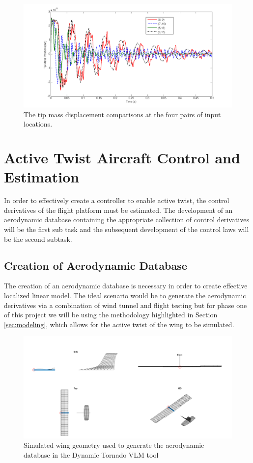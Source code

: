 \documentclass[11pt]{ucthesis}
\begin{document}
\begin{figure}[thpb]
\centering
\includegraphics[width=1\linewidth]{Figures/twoinput_tip.png}
\caption{The tip mass displacement comparisons at the four pairs of input locations.}
\label{twosystemP}
\end{figure}

\section{Active Twist Aircraft Control and Estimation}
In order to effectively create a controller to enable active twist, the control derivatives of the flight platform must be estimated. The development of an aerodynamic database containing the appropriate collection of control derivatives will be the first sub task and the subsequent development of the control laws will be the second subtask.

\subsection{Creation of Aerodynamic Database}
The creation of an aerodynamic database is necessary in order to create effective localized linear model. The ideal scenario would be to generate the aerodynamic derivatives via a combination of wind tunnel and flight testing but for phase one of this project we will be using the methodology highlighted in Section \ref{sec:modeling}, which allows for the active twist of the wing to be simulated.

\begin{figure}[thpb]
\centering
\includegraphics[width=1\linewidth]{Figures/SimulationMultiAngleView.png}
\caption{Simulated wing geometry used to generate the aerodynamic database in the Dynamic Tornado VLM tool}
\label{fig:AmultiAngle}
\end{figure}
\end{document}
